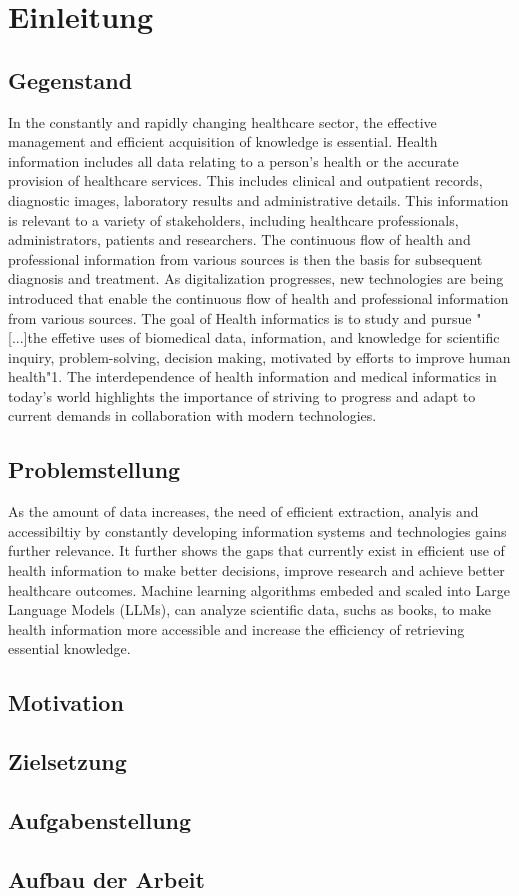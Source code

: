 \chapter{Einleitung}\label{ch:introduction}
\section{Gegenstand}
In the constantly and rapidly changing healthcare sector, the effective management and efficient acquisition of knowledge is essential. Health information includes all data relating to a person's health or the accurate provision of healthcare services. This includes clinical and outpatient records, diagnostic images, laboratory results and administrative details. This information is relevant to a variety of stakeholders, including healthcare professionals, administrators, patients and researchers. The continuous flow of health and professional information from various sources is then the basis for subsequent diagnosis and treatment. As digitalization progresses, new technologies are being introduced that enable the continuous flow of health and professional information from various sources. 
The goal of Health informatics is to study and pursue "[...]the effetive uses of biomedical data, information, and knowledge for scientific inquiry, problem-solving, decision making, motivated by efforts to improve human health"1. 
The interdependence of health information and medical informatics in today's world highlights the importance of striving to progress and adapt to current demands in collaboration with modern technologies.

\section{Problemstellung}
As the amount of data increases, the need of efficient extraction, analyis and accessibiltiy by constantly developing information systems and technologies gains further relevance. It further shows the gaps that currently exist in efficient use of health information to make better decisions, improve research and achieve better healthcare outcomes. Machine learning algorithms embeded and scaled into Large Language Models (LLMs), can analyze scientific data, suchs as books, to make health information more accessible and increase the efficiency of retrieving essential knowledge.

\section{Motivation}


\section{Zielsetzung}\label{sec:zielsetzung}


\section{Aufgabenstellung}



\section{Aufbau der Arbeit}
